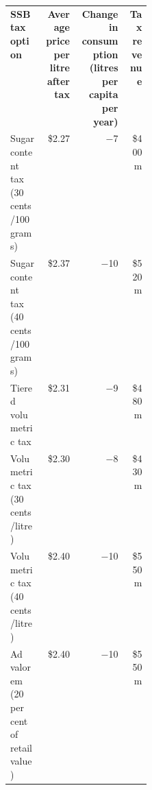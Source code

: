 \bgroup
\def\arraystretch{1.5}
\begin{tabularx}{\columnwidth}{p{0.24\linewidth}RRr}
\toprule
\textbf{SSB tax option} & \textbf{Average price per litre after~tax} & \textbf{Change in consumption (litres per capita per year)} & \textbf{Tax revenue} \\ \cmidrule(lr){1-4}
Sugar content tax (30 cents/100 grams) & \$2.27 & $-$7 & \$400m \\
Sugar content tax (40 cents/100 grams) & \$2.37 & $-$10 & \$520m \\
Tiered volumetric tax & \$2.31 & $-$9 & \$480m \\
Volumetric tax (30 cents/litre) & \$2.30 & $-$8 & \$430m \\
Volumetric tax (40 cents/litre) & \$2.40 & $-$10 & \$550m \\
Ad valorem (20 per cent of retail value) & \$2.40 & $-$10 & \$550m \\
\bottomrule
\end{tabularx}
\egroup